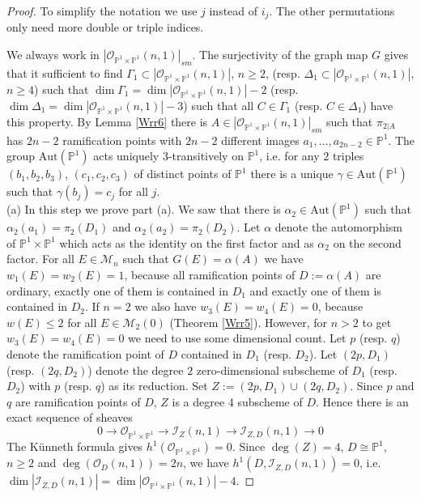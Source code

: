 \documentclass[
  a4paper, 
  reqno, 
  oneside, 
  11pt
]{amsart}
\theoremstyle{plain}	%
\theoremstyle{mydef} %
\theoremstyle{remark}
\theoremstyle{definition}
\theoremstyle{remark}
\begin{document}
\begin{proof}
To simplify the notation we use $j$ instead of $i_j$. The other permutations only need more double or triple indices.

We always work in $|\mathcal O_{\mathbb P^1\times \mathbb P^1}(n,1)|_{sm}$. The surjectivity of the graph map $G$ \cite[Th. 5.2.2]{BH} gives that it sufficient to find
$\Gamma_1\subset |\mathcal O_{\mathbb P^1\times \mathbb P^1}(n,1)|$, $n\ge 2$, (resp. $\Delta_1\subset |\mathcal O_{\mathbb P^1\times \mathbb P^1}(n,1)|$, $n\ge 4$) such that
$\dim \Gamma _1 =\dim |\mathcal O_{\mathbb P^1\times \mathbb P^1}(n,1)| -2$ (resp. $\dim \Delta _1 =\dim |\mathcal O_{\mathbb P^1\times \mathbb P^1}(n,1)| -3$) such that all $C\in \Gamma_1$ (resp. $C\in \Delta_1$) have this
 property.
By Lemma \ref{Wrr6} there is $A\in |\mathcal O_{\mathbb P^1\times \mathbb P^1}(n,1)|_{sm}$ such that $\pi_{2|A}$ has $2n-2$ ramification points with $2n-2$ different images $a_1,\dots ,a_{2n-2}\in \mathbb P^1$. The group $\mathrm{Aut}(\mathbb P^1)$ acts uniquely 3-transitively on $\mathbb P^1$, i.e. for any $2$ triples $(b_1,b_2,b_3)$, $(c_1,c_2,c_3)$ of distinct points of $\mathbb P^1$ there is a unique $\gamma\in \mathrm{Aut}(\mathbb P^1)$ such that $\gamma(b_j)=c_j$ for all $j$.\\

 (a) In this step we prove part (a).  We saw that
there is $\alpha_2 \in \mathrm{Aut}(\mathbb P^1)$ such that $\alpha_2(a_1) =\pi_2(D_1)$ and $\alpha_2(a_2)= \pi_2(D_2)$. Let $\alpha$ denote the automorphism of $\mathbb P^1\times \mathbb P^1$ which acts as the identity 
on the first factor and as $\alpha_2$ on the second factor. For all $E\in \mathcal M_n$ such that $G(E)=\alpha(A)$
we have $w_1(E)=w_2(E)=1$, because all ramification points of $D:= \alpha(A)$ are ordinary, 
exactly one of  them is contained in $D_1$ and exactly one of them is contained in $D_2$. 
If $n=2$ we also have $w_3(E)=w_4(E)=0$, because $w(E)\le 2$ for all $E\in \mathcal M_{2}(0)$ 
(Theorem \ref{Wrr5}). However, for $n>2$ to get $w_3(E)=w_4(E)=0$ we need to use some dimensional count.
Let $p$ (resp. $q$) denote the ramification point of $D$ contained in $D_1$ (resp. $D_2$). Let $(2p,D_1)$ (resp. $(2q,D_2)$) denote the degree $2$ zero-dimensional subscheme of $D_1$ (resp. $D_2$) with $p$ (resp. $q$) as its reduction. Set $Z:= (2p,D_1)\cup (2q,D_2)$. Since $p$ and $q$ are ramification points of $D$, $Z$ is a degree $4$ subscheme of $D$. Hence there is an exact sequence of sheaves
\begin{equation}\label{eqb1}
0\to \mathcal O_{\mathbb P^1\times \mathbb P^1}\to \mathcal I_Z(n,1)\to \mathcal I_{Z,D}(n,1)\to 0
\end{equation}
 The K\"{u}nneth formula gives $h^1(\mathcal O_{\mathbb P^1\times \mathbb P^1})=0$. Since $\deg(Z)=4$, $D\cong \mathbb P^1$, $n\ge 2$ and $\deg(\mathcal O_D(n,1)) =2n$, we have
$h^1(D,\mathcal I_{Z,D}(n,1)) =0$, i.e. $\dim |\mathcal I_{Z,D}(n,1)| =\dim |\mathcal O_{\mathbb P^1\times \mathbb P^1}(n,1)|-4$. 


\end{proof}
\end{document}
